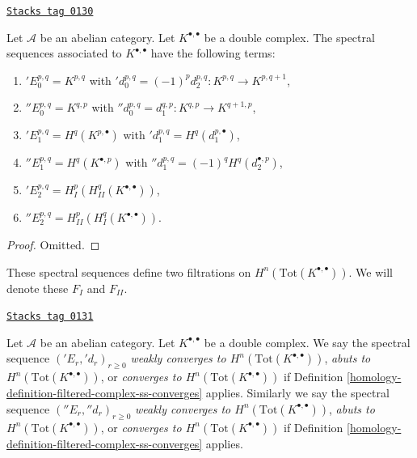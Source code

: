 \begin{lemma}
\label{homology-lemma-ss-double-complex}
\href{https://stacks.math.columbia.edu/tag/0130}{\texttt{Stacks tag 0130}}

Let $\mathcal{A}$ be an abelian category.
Let $K^{\bullet, \bullet}$ be a double complex.
The spectral sequences associated to $K^{\bullet, \bullet}$
have the following terms:
\begin{enumerate}
\item ${}'E_0^{p, q} = K^{p, q}$ with
${}'d_0^{p, q} = (-1)^p d_2^{p, q} : K^{p, q} \to K^{p, q + 1}$,
\item ${}''E_0^{p, q} = K^{q, p}$ with
${}''d_0^{p, q} = d_1^{q, p} : K^{q, p} \to K^{q + 1, p}$,
\item ${}'E_1^{p, q} = H^q(K^{p, \bullet})$ with
${}'d_1^{p, q} = H^q(d_1^{p, \bullet})$,
\item ${}''E_1^{p, q} = H^q(K^{\bullet, p})$ with
${}''d_1^{p, q} = (-1)^q H^q(d_2^{\bullet, p})$,
\item ${}'E_2^{p, q} = H^p_I(H^q_{II}(K^{\bullet, \bullet}))$,
\item ${}''E_2^{p, q} = H^p_{II}(H^q_I(K^{\bullet, \bullet}))$.
\end{enumerate}
\end{lemma}

\begin{proof}
Omitted.
\end{proof}

These spectral sequences define two filtrations on
$H^n(\text{Tot}(K^{\bullet, \bullet}))$.
We will denote these $F_I$ and $F_{II}$.

\begin{definition}
\label{homology-definition-ss-double-complex-converge}
\href{https://stacks.math.columbia.edu/tag/0131}{\texttt{Stacks tag 0131}}

Let $\mathcal{A}$ be an abelian category.
Let $K^{\bullet, \bullet}$ be a double complex.
We say the spectral sequence $({}'E_r, {}'d_r)_{r \geq 0}$
{\it weakly converges to $H^n(\text{Tot}(K^{\bullet, \bullet}))$},
{\it abuts to $H^n(\text{Tot}(K^{\bullet, \bullet}))$}, or
{\it converges to $H^n(\text{Tot}(K^{\bullet, \bullet}))$}
if Definition \ref{homology-definition-filtered-complex-ss-converges} applies.
Similarly we say the spectral sequence $({}''E_r, {}''d_r)_{r \geq 0}$
{\it weakly converges to $H^n(\text{Tot}(K^{\bullet, \bullet}))$},
{\it abuts to $H^n(\text{Tot}(K^{\bullet, \bullet}))$}, or
{\it converges to $H^n(\text{Tot}(K^{\bullet, \bullet}))$}
if Definition \ref{homology-definition-filtered-complex-ss-converges} applies.
\end{definition}

